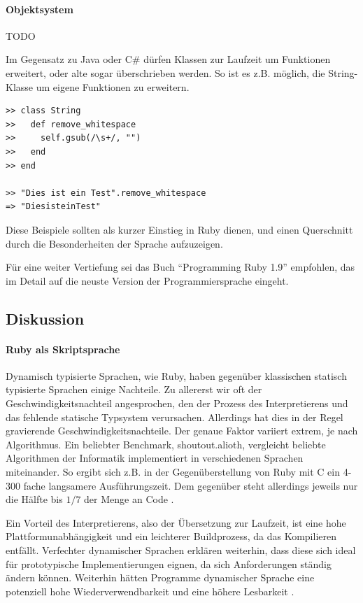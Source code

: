 \paragraph{Objektsystem}
TODO

Im Gegensatz zu Java oder C\# dürfen Klassen zur Laufzeit um Funktionen erweitert, oder alte sogar überschrieben werden. So ist es z.B. möglich, die String-Klasse um eigene Funktionen zu erweitern.

\begin{lstlisting}
>> class String
>>   def remove_whitespace
>>     self.gsub(/\s+/, "")
>>   end
>> end

>> "Dies ist ein Test".remove_whitespace
=> "DiesisteinTest"

\end{lstlisting}

Diese Beispiele sollten als kurzer Einstieg in Ruby dienen, und einen Querschnitt durch die Besonderheiten der Sprache aufzuzeigen.

Für eine weiter Vertiefung sei das Buch "`Programming Ruby 1.9"' empfohlen, das im Detail auf die neuste Version der Programmiersprache eingeht. %

\subsection{Diskussion}

\paragraph{Ruby als Skriptsprache}
Dynamisch typisierte Sprachen, wie Ruby, haben gegenüber klassischen statisch typisierte Sprachen einige Nachteile. Zu allererst wir oft der Geschwindigkeitsnachteil angesprochen, den der Prozess des Interpretierens und das fehlende statische Typsystem verursachen.
Allerdings hat dies in der Regel gravierende Geschwindigkeitsnachteile. Der genaue Faktor variiert extrem, je nach Algorithmus. Ein beliebter Benchmark, shoutout.alioth, vergleicht beliebte Algorithmen der Informatik implementiert in verschiedenen Sprachen miteinander. So ergibt sich z.B. in der Gegenüberstellung von Ruby mit C ein 4-300 fache langsamere Ausführungszeit. Dem gegenüber steht allerdings jeweils nur die Hälfte bis $1/7$ der Menge an Code \citep{computer_language_benchmarks_game_ruby_2011}.

Ein Vorteil des Interpretierens, also der Übersetzung zur Laufzeit, ist eine hohe Plattformunabhängigkeit und ein leichterer Buildprozess, da das Kompilieren entfällt. 
Verfechter dynamischer Sprachen erklären weiterhin, dass diese sich ideal für prototypische Implementierungen eignen, da sich Anforderungen ständig ändern können. Weiterhin hätten Programme dynamischer Sprache eine potenziell hohe Wiederverwendbarkeit und eine höhere Lesbarkeit \citep{meijer_static_2005} \citep{ousterhout_scripting:_1998}.

